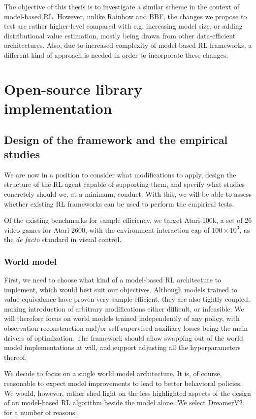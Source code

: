 \documentclass[en]{pracamgr}
\begin{document}
The objective of this thesis is to investigate a similar scheme in the context of model-based RL. However, unlike Rainbow and BBF, the changes we propose to test are rather higher-level compared with e.g. increasing model size, or adding distributional value estimation, mostly being drawn from other data-efficient architectures. Also, due to increased complexity of model-based RL frameworks, a different kind of approach is needed in order to incorporate these changes.

\chapter{Open-source library implementation}

\section{Design of the framework and the empirical studies}

We are now in a position to consider what modifications to apply, design the structure of the RL agent capable of supporting them, and specify what studies concretely should we, at a minimum, conduct. With this, we will be able to assess whether existing RL frameworks can be used to perform the empirical tests.

Of the existing benchmarks for sample efficiency, we target Atari-100k, a set of 26 video games for Atari 2600, with the environment interaction cap of $100 \times 10^3$, as the \emph{de facto} standard in visual control.

\subsection{World model}

First, we need to choose what kind of a model-based RL architecture to implement, which would best suit our objectives. Although models trained to value equivalence have proven very sample-efficient, they are also tightly coupled, making introduction of arbitrary modifications either difficult, or infeasible. We will therefore focus on world models trained independently of any policy, with observation reconstruction and/or self-supervised auxiliary losses being the main drivers of optimization. The framework should allow swapping out of the world model implementations at will, and support adjusting all the hyperparameters thereof.

We decide to focus on a single world model architecture. It is, of course, reasonable to expect model improvements to lead to better behavioral policies. We would, however, rather shed light on the less-highlighted aspects of the design of an model-based RL algorithm beside the model alone. We select DreamerV2 \autocite{hafnerMasteringAtariDiscrete2022} for a number of reasons:
\end{document}
